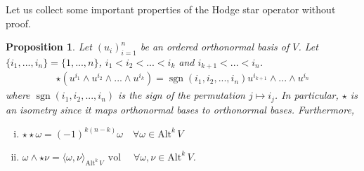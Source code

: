 \documentclass[12pt,a4paper]{article}
\numberwithin{equation}{subsection}
\numberwithin{lemma}{subsection}
\newtheorem{proposition}[lemma]{Proposition}
\theoremstyle{definition}
\DeclareMathOperator{\sgn}{sgn}
\DeclareMathOperator{\vol}{vol}
\newcommand{\alternating}[2]{ {\text{Alt}^{#1}\,#2} }
\begin{document}
Let us collect some important properties of the Hodge star operator 
without proof.
\begin{proposition}\label{prop:properties_hodge_star}
    Let $(u_i)_{i=1}^n$ be an ordered orthonormal basis of $V$. Let 
    $\{ i_1, ..., i_n \} = \{ 1, ..., n\}$, $i_1 < i_2 < ... < i_k$ and 
    $i_{k+1} < ... < i_n$.
    \begin{align}
        \star (u^{i_1} \wedge u^{i_2} \wedge ... \wedge u^{i_k})
        = \sgn(i_1,i_2,...,i_n) u^{i_{k+1}} \wedge ... \wedge u^{i_{n}}
        \label{eq:hodge_star_orthonormal_basis}
    \end{align}
    where $\sgn(i_1,i_2,...,i_n)$ 
    is the sign of the permutation $j \mapsto i_j$. In particular, 
    $\star$ is an isometry since it maps orthonormal bases to orthonormal 
    bases. Furthermore,
    \begin{enumerate}[(i)]
        \item $\star \star \omega = (-1)^{k(n-k)} \omega \quad \forall \omega 
            \in \alternating{k}{V}$
        \item $\omega \wedge \star \nu = \langle \omega, \nu \rangle
            _{\alternating{k}{V}}  \, \vol \quad \forall \omega, \nu \in \alternating{k}{V}$.     
    \end{enumerate}
\end{proposition}
\end{document}
